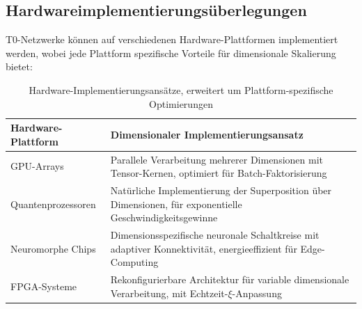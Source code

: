 \subsection{Hardwareimplementierungsüberlegungen}
\label{subsec:hardware_implementation}
T0-Netzwerke können auf verschiedenen Hardware-Plattformen implementiert werden, wobei jede Plattform spezifische Vorteile für dimensionale Skalierung bietet:
\begin{table}[htbp]
	\centering
	\begin{tabular}{lp{8cm}}
		\toprule
		\textbf{Hardware-Plattform} & \textbf{Dimensionaler Implementierungsansatz} \\
		\midrule
		GPU-Arrays & Parallele Verarbeitung mehrerer Dimensionen mit Tensor-Kernen, optimiert für Batch-Faktorisierung \\
		Quantenprozessoren & Natürliche Implementierung der Superposition über Dimensionen, für exponentielle Geschwindigkeitsgewinne \\
		Neuromorphe Chips & Dimensionsspezifische neuronale Schaltkreise mit adaptiver Konnektivität, energieeffizient für Edge-Computing \\
		FPGA-Systeme & Rekonfigurierbare Architektur für variable dimensionale Verarbeitung, mit Echtzeit-$\xi$-Anpassung \\
		\bottomrule
	\end{tabular}
	\caption{Hardware-Implementierungsansätze, erweitert um Plattform-spezifische Optimierungen}
	\label{tab:hardware_approaches}
\end{table}
